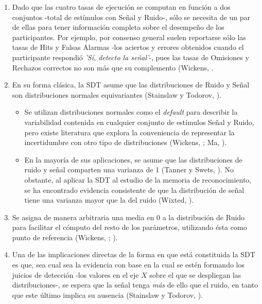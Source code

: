\begin{enumerate}

\item  Dado que las cuatro tasas de ejecución se computan en función a dos conjuntos -total de estímulos con Señal y Ruido-, sólo se necesita de un par de ellas para tener información completa sobre el desempeño de los participantes. Por ejemplo, por consenso general suelen reportarse sólo las tasas de Hits y Falsas Alarmas -los aciertos y errores obtenidos cuando el participante respondió \textit{'Sí, detecto la señal'}-, pues las tasas de Omisiones y Rechazos correctos no son más que su complemento (Wickens, \citeyear{Wickens1}.\\

\item En su forma clásica, la SDT asume que las distribuciones de Ruido y Señal son distribuciones normales equivariantes (Stainslaw y Todorov, \citeyear{Stainslaw1999}).\\
  \begin{itemize}
  \item Se utilizan distribuciones normales como el \textit{default} para describir la variabilidad contenida en cualquier conjunto de estímulos Señal y Ruido, pero existe literatura que explora la conveniencia de representar la incertidumbre con otro tipo de distribuciones (Wickens, \citeyear{Wickens1}; Ma, \citeyear{WeijiMa2009}).\\
  \item En la mayoría de sus aplicaciones, se asume que las distribuciones de ruido y señal comparten una varianza de 1 (Tanner y Swets, \citeyear{Tanner1954}). No obstante, al aplicar la SDT al estudio de la memoria de reconocimiento, se ha encontrado evidencia consistente de que la distribución de señal tiene una varianza mayor que la del ruido (Wixted, \citeyear{Wixted2007}).\\
  \end{itemize}

\item Se asigna de manera arbitraria una media en 0 a la distribución de Ruido para facilitar el cómputo del resto de los parámetros, utilizando ésta como punto de referencia (Wickens, \citeyear{Wickens1}; \citeyear{Gescheider}).\\

\item Una de las implicaciones directas de la forma en que está constituida la SDT es que, sea cual sea la evidencia con base en la cual se estén formando los juicios de detección -los valores en el eje $X$ sobre el que se despliegan las distribuciones-, se espera que la señal tenga \textit{más} de ello que el ruido, en tanto que este último implica su ausencia (Stainslaw y Todorov, \citeyear{Stainslaw1999}).\\
  \begin{itemize}


\end{itemize}
\end{enumerate}
